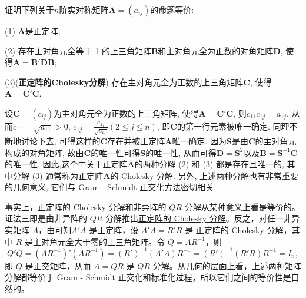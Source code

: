 \documentclass[../../main.tex]{subfiles}
\begin{document}
\begin{proposition}\label{proposition:正定阵的3个充要条件}
证明下列关于$n$阶实对称矩阵$\boldsymbol{A}=(a_{ij})$的命题等价:

(1) $\boldsymbol{A}$是正定阵;

(2) 存在主对角元全等于 1 的上三角矩阵$\boldsymbol{B}$和主对角元全为正数的对角矩阵$\boldsymbol{D}$, 使得$\boldsymbol{A}=\boldsymbol{B}'\boldsymbol{D}\boldsymbol{B}$;

(3)(\textbf{正定阵的Cholesky分解}) 存在主对角元全为正数的上三角矩阵$\boldsymbol{C}$, 使得$\boldsymbol{A}=\boldsymbol{C}'\boldsymbol{C}$.
\end{proposition}
\begin{remark}
设$\boldsymbol{C}=(c_{ij})$为主对角元全为正数的上三角矩阵, 使得$\boldsymbol{A}=\boldsymbol{C}'\boldsymbol{C}$, 则$c_{11}c_{1j}=a_{1j}$, 从而$c_{11}=\sqrt{a_{11}}>0$, $c_{1j}=\frac{a_{1j}}{\sqrt{a_{11}}}(2\leq j\leq n)$, 即$\boldsymbol{C}$的第一行元素被唯一确定. 同理不断地讨论下去, 可得这样的$\boldsymbol{C}$存在并被正定阵$\boldsymbol{A}$唯一确定. 因为$\boldsymbol{S}$是由$\boldsymbol{C}$的主对角元构成的对角矩阵, 故由$\boldsymbol{C}$的唯一性可得$\boldsymbol{S}$的唯一性, 从而可得$\boldsymbol{D}=\boldsymbol{S}^2$以及$\boldsymbol{B}=\boldsymbol{S}^{-1}\boldsymbol{C}$的唯一性. 因此,这个中关于正定阵$\boldsymbol{A}$的两种分解 (2) 和 (3) 都是存在且唯一的, 其中分解 (3) 通常称为正定阵$\boldsymbol{A}$的 Cholesky 分解. 另外, 上述两种分解也有非常重要的几何意义, 它们与 Gram - Schmidt 正交化方法密切相关. 
\end{remark}
\begin{remark}
事实上，\hyperref[proposition:正定阵的3个充要条件]{正定阵的 Cholesky 分解}和非异阵的 $QR$ 分解从某种意义上看是等价的。{\color{blue}证法三}即是由非异阵的 $QR$ 分解推出\hyperref[proposition:正定阵的3个充要条件]{正定阵的 Cholesky 分解}。反之，对任一非异实矩阵 $A$，由可知$A'A$ 是正定阵，设 $A'A = R'R$ 是 \hyperref[proposition:正定阵的3个充要条件]{正定阵的 Cholesky 分解}，其中 $R$ 是主对角元全大于零的上三角矩阵。令 $Q = AR^{-1}$，则
\[
Q'Q=(AR^{-1})'(AR^{-1})=(R')^{-1}(A'A)R^{-1}=(R')^{-1}(R'R)R^{-1}=I_n,
\]
即 $Q$ 是正交矩阵，从而 $A = QR$ 是 $QR$ 分解。从几何的层面上看，上述两种矩阵分解都等价于 Gram - Schmidt 正交化和标准化过程，所以它们之间的等价性是自然的。
\end{remark}
\end{document}
